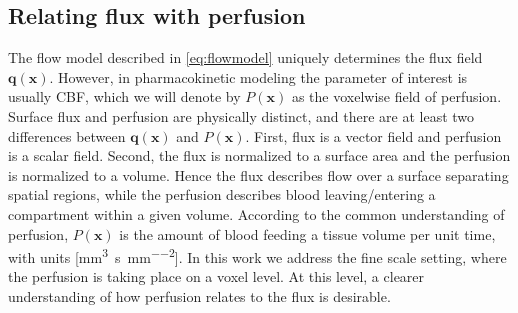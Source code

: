 \documentclass[10pt]{article}
\begin{document}


	\subsection{Relating flux with perfusion}\label{sec:flux2perf}
	The flow model described in \eqref{eq:flowmodel} uniquely determines the flux field $\mathbf{q}(\mathbf{x})$. 
	However, in pharmacokinetic modeling the parameter of interest is usually CBF, which we will denote by $P (\mathbf{x})$ as the voxelwise field of perfusion. Surface flux and perfusion are physically distinct, and there are at least two differences between $\mathbf{q}(\mathbf{x})$ and $P (\mathbf{x})$. 
	First, flux is a vector field and perfusion is a scalar field. Second, the flux is normalized to a surface area and the perfusion is normalized to a volume. 
	Hence the flux describes flow over a surface separating spatial regions, while the perfusion describes blood leaving/entering a compartment within a given volume. 	
According to the common understanding of perfusion,
	 $P (\mathbf{x})$ is the amount of blood feeding a tissue volume per unit time, with units [\si{\milli\meter\cubed\per\second\per\milli\meter\squared}]. 
	 In this work we address the  fine scale setting, where the perfusion is taking place on a voxel level. At this level, a clearer understanding of how perfusion relates to the flux is desirable.  
\end{document}
